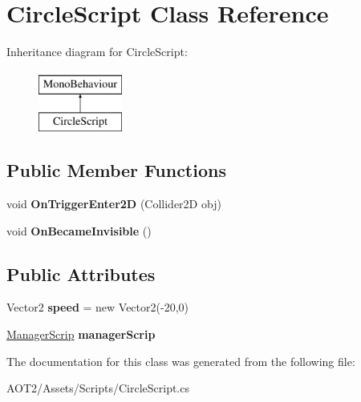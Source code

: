 \hypertarget{class_circle_script}{}\section{Circle\+Script Class Reference}
\label{class_circle_script}
Inheritance diagram for Circle\+Script\+:\begin{figure}[H]
\begin{center}
\leavevmode
\includegraphics[height=2.000000cm]{class_circle_script}
\end{center}
\end{figure}
\subsection*{Public Member Functions}
\begin{DoxyCompactItemize}
\item 
\hypertarget{class_circle_script_a1d1b1b39ff03be1b31fa855760e2f704}{}void {\bfseries On\+Trigger\+Enter2\+D} (Collider2\+D obj)\label{class_circle_script_a1d1b1b39ff03be1b31fa855760e2f704}

\item 
\hypertarget{class_circle_script_ac2f21c8ce3074c924eece8d688a5a87f}{}void {\bfseries On\+Became\+Invisible} ()\label{class_circle_script_ac2f21c8ce3074c924eece8d688a5a87f}

\end{DoxyCompactItemize}
\subsection*{Public Attributes}
\begin{DoxyCompactItemize}
\item 
\hypertarget{class_circle_script_a4b8a0a38630b44c7e210b8b6be2549c2}{}Vector2 {\bfseries speed} = new Vector2(-\/20,0)\label{class_circle_script_a4b8a0a38630b44c7e210b8b6be2549c2}

\item 
\hypertarget{class_circle_script_a0585d353c5aea4b4c10f568c46f103a3}{}\hyperlink{class_manager_scrip}{Manager\+Scrip} {\bfseries manager\+Scrip}\label{class_circle_script_a0585d353c5aea4b4c10f568c46f103a3}

\end{DoxyCompactItemize}


The documentation for this class was generated from the following file\+:\begin{DoxyCompactItemize}
\item 
A\+O\+T2/\+Assets/\+Scripts/Circle\+Script.\+cs\end{DoxyCompactItemize}
